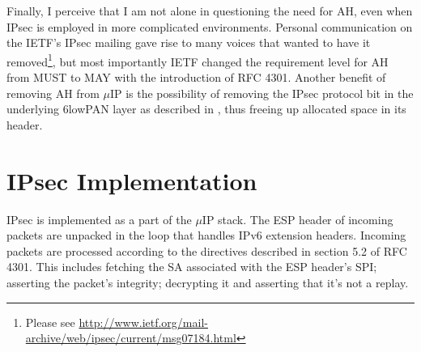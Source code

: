 \documentclass[final,a4paper,twoside,11pt,onecolumn]{report}
\begin{document}
Finally, I perceive that I am not alone in questioning the need for AH, even when IPsec is employed in more complicated environments. Personal communication on the IETF's IPsec mailing gave rise to many voices that wanted to have it removed\footnote{Please see \url{http://www.ietf.org/mail-archive/web/ipsec/current/msg07184.html}}, but most importantly IETF changed the requirement level for AH from MUST to MAY with the introduction of RFC 4301. Another benefit of removing AH from $\mu$IP is the possibility of removing the IPsec protocol bit in the underlying 6lowPAN layer as described in \cite{raza2011securing}, thus freeing up allocated space in its header.



% 
% 
% 


\section{IPsec Implementation}
IPsec is implemented as a part of the $\mu$IP stack. The ESP header of incoming packets are unpacked in the loop that handles IPv6 extension headers. Incoming packets are processed according to the directives described in section 5.2 of RFC 4301. This includes fetching the SA associated with the ESP header's SPI; asserting the packet's integrity; decrypting it and asserting that it's not a replay.
\end{document}
